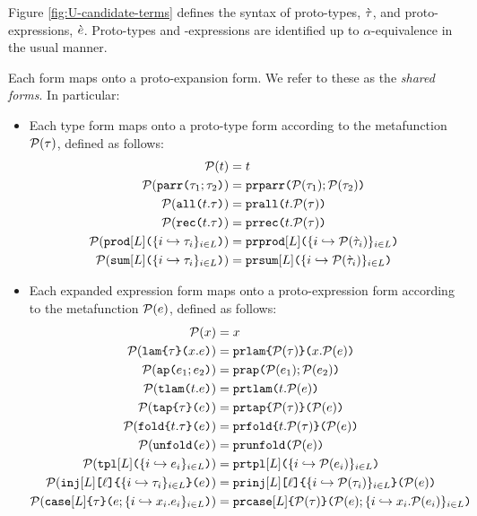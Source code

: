 Figure \ref{fig:U-candidate-terms} defines the syntax of proto-types, $\ctau$, and proto-expressions, $\ce$. Proto-types and -expressions are identified up to $\alpha$-equivalence in the usual manner.

Each form maps onto a proto-expansion form. We refer to these as the \emph{shared forms}. In particular:

\begin{itemize}
  \item Each type form maps onto a proto-type form according to the metafunction $\Cof{\tau}$, defined as follows:
  \begin{align*}
  \Cof{t} & = t\\
  \Cof{\aparr{\tau_1}{\tau_2}} & = \aceparr{\Cof{\tau_1}}{\Cof{\tau_2}}\\
  \Cof{\aall{t}{\tau}} & = \aceall{t}{\Cof{\tau}}\\
  \Cof{\arec{t}{\tau}} & = \acerec{t}{\Cof{\tau}}\\
  \Cof{\aprod{\labelset}{\mapschema{\tau}{i}{\labelset}}} & = \aceprod{\labelset}{\mapschemax{\Cofv}{\ctau}{i}{\labelset}}\\
  \Cof{\asum{\labelset}{\mapschema{\tau}{i}{\labelset}}} & = \acesum{\labelset}{\mapschemax{\Cofv}{\ctau}{i}{\labelset}}
  \end{align*}
  \item Each expanded expression form maps onto a proto-expression form according to the metafunction $\Cof{e}$, defined as follows:
  \begin{align*}
  \Cof{x} & = x\\
  \Cof{\aelam{\tau}{x}{e}} & = \acelam{\Cof{\tau}}{x}{\Cof{e}}\\
  \Cof{\aeap{e_1}{e_2}} & = \aceap{\Cof{e_1}}{\Cof{e_2}}\\
  \Cof{\aetlam{t}{e}} & = \acetlam{t}{\Cof{e}}\\
  \Cof{\aetap{e}{\tau}} & = \acetap{\Cof{e}}{\Cof{\tau}}\\
  \Cof{\aefold{t}{\tau}{e}} & = \acefold{t}{\Cof\tau}{\Cof e}\\
  \Cof{\aeunfold{e}} & = \aceunfold{\Cof{e}}\\
  \Cof{\aetpl{\labelset}{\mapschema{e}{i}{\labelset}}} & = \acetpl{\labelset}{\mapschemax{\Cofv}{e}{i}{\labelset}}\\
  \Cof{\aein{\labelset}{\ell}{\mapschema{\tau}{i}{\labelset}}{e}} &= \acein{\labelset}{\ell}{\mapschemax{\Cofv}{\tau}{i}{\labelset}}{\Cof{e}}\\
  \Cof{\aecase{\labelset}{\tau}{e}{\mapschemab{x}{e}{i}{\labelset}}} & = \acecase{\labelset}{\Cof\tau}{\Cof{e}}{\mapschemacx{\Cofv}{x}{e}{i}{\labelset}}
\end{align*}

\end{itemize}


